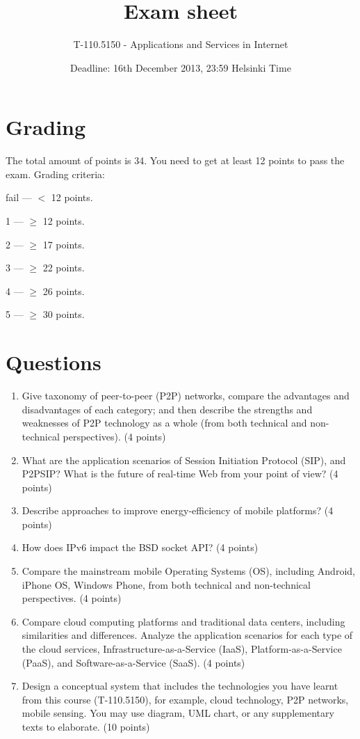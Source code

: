 \documentclass{article}
\title{Exam sheet}
\author{T-110.5150 - Applications and Services in Internet}
\date{Deadline: 16th December 2013, 23:59 Helsinki Time}
\begin{document}
\maketitle

\section*{Grading}
The total amount of points is 34. You need to get at least 12 points to pass the exam. Grading criteria:
\vskip 10pt

fail --- $<$ 12 points.

1 --- $\ge$ 12 points.

2 --- $\ge$ 17 points.

3 --- $\ge$ 22 points.

4 --- $\ge$ 26 points.

5 --- $\ge$ 30 points.

\section*{Questions}
\begin{enumerate}
\item  Give taxonomy of peer-to-peer (P2P) networks, compare the advantages and disadvantages of each category; and then describe the strengths and weaknesses of P2P technology as a whole (from both technical and non-technical perspectives). (4 points)

\item What are the application scenarios of Session Initiation Protocol (SIP), and P2PSIP? What is the future of real-time Web from your point of view? (4 points)

\item Describe approaches to improve energy-efficiency of mobile platforms? (4 points)

\item How does IPv6 impact the BSD socket API? (4 points)

\item Compare the mainstream mobile Operating Systems (OS), including Android, iPhone OS, Windows Phone, from both technical and non-technical perspectives. (4 points)

\item Compare cloud computing platforms and traditional data centers, including similarities and differences. Analyze the application scenarios for each type of the cloud services, Infrastructure-as-a-Service (IaaS), Platform-as-a-Service (PaaS), and Software-as-a-Service (SaaS). (4 points)

\item Design a conceptual system that includes the technologies you have learnt from this course (T-110.5150), for example, cloud technology, P2P networks, mobile sensing. You may use diagram, UML chart, or any supplementary texts to elaborate. (10 points)

\end{enumerate}
\end{document}
